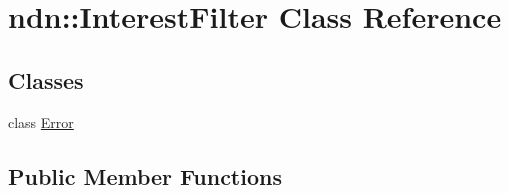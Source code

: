 \hypertarget{classndn_1_1InterestFilter}{}\section{ndn\+:\+:Interest\+Filter Class Reference}
\label{classndn_1_1InterestFilter}
\subsection*{Classes}
\begin{DoxyCompactItemize}
\item 
class \hyperlink{classndn_1_1InterestFilter_1_1Error}{Error}
\end{DoxyCompactItemize}
\subsection*{Public Member Functions}

